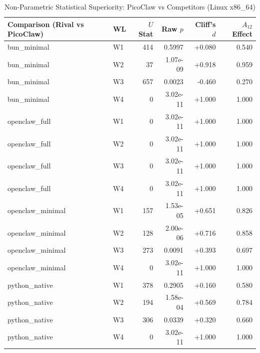 \begin{table}[t]
\centering\small
\caption{Non-Parametric Statistical Superiority: PicoClaw vs Competitors (Linux x86_64)}
\label{tab:linux_stat_tests}
\begin{tabular}{llrrrr}
\toprule
Comparison (Rival vs PicoClaw) & WL & $U$ Stat & Raw $p$ & Cliff's $d$ & $A_{12}$ Effect \\
\midrule
bun\_minimal & W1 & 414 & 0.5997 & +0.080 & 0.540 \\
bun\_minimal & W2 & 37 & 1.07e-09 & +0.918 & 0.959 \\
bun\_minimal & W3 & 657 & 0.0023 & -0.460 & 0.270 \\
bun\_minimal & W4 & 0 & 3.02e-11 & +1.000 & 1.000 \\
openclaw\_full & W1 & 0 & 3.02e-11 & +1.000 & 1.000 \\
openclaw\_full & W2 & 0 & 3.02e-11 & +1.000 & 1.000 \\
openclaw\_full & W3 & 0 & 3.02e-11 & +1.000 & 1.000 \\
openclaw\_full & W4 & 0 & 3.02e-11 & +1.000 & 1.000 \\
openclaw\_minimal & W1 & 157 & 1.53e-05 & +0.651 & 0.826 \\
openclaw\_minimal & W2 & 128 & 2.00e-06 & +0.716 & 0.858 \\
openclaw\_minimal & W3 & 273 & 0.0091 & +0.393 & 0.697 \\
openclaw\_minimal & W4 & 0 & 3.02e-11 & +1.000 & 1.000 \\
python\_native & W1 & 378 & 0.2905 & +0.160 & 0.580 \\
python\_native & W2 & 194 & 1.58e-04 & +0.569 & 0.784 \\
python\_native & W3 & 306 & 0.0339 & +0.320 & 0.660 \\
python\_native & W4 & 0 & 3.02e-11 & +1.000 & 1.000 \\
\bottomrule
\end{tabular}
\end{table}

